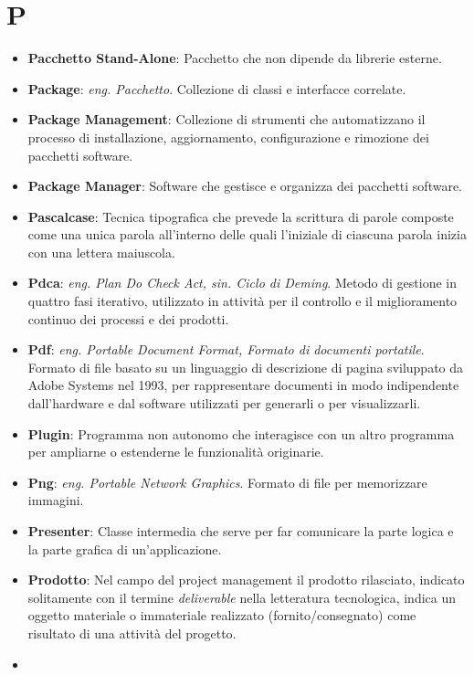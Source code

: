\section*{P}
\begin{itemize}
	\item
	\textbf{Pacchetto Stand-Alone}: Pacchetto che non dipende da librerie esterne.
	\item
	\textbf{Package}: \textit{eng. Pacchetto}. Collezione di classi e interfacce correlate.
	\item
	\textbf{Package Management}: Collezione di strumenti che automatizzano il processo di installazione, aggiornamento, configurazione e rimozione dei pacchetti software.
	\item
	\textbf{Package Manager}: Software che gestisce e organizza dei pacchetti software.
	\item
	\textbf{Pascalcase}: Tecnica tipografica che prevede la scrittura di parole composte come una unica parola all'interno delle quali l'iniziale di ciascuna parola inizia con una lettera maiuscola.
	\item
	\textbf{Pdca}: \textit{eng. Plan Do Check Act, sin. Ciclo di Deming}. Metodo di gestione in quattro fasi iterativo, utilizzato in attività per il controllo e il miglioramento continuo dei processi e dei prodotti.
	\item
	\textbf{Pdf}: \textit{eng. Portable Document Format, Formato di documenti portatile}. Formato di file basato su un linguaggio di descrizione di pagina sviluppato da Adobe Systems nel 1993, per rappresentare documenti in modo indipendente dall'hardware e dal software utilizzati per generarli o per visualizzarli.
	\item
	\textbf{Plugin}: Programma non autonomo che interagisce con un altro programma per ampliarne o estenderne le funzionalità originarie.
	\item
	\textbf{Png}: \textit{eng. Portable Network Graphics}. Formato di file per memorizzare immagini.
	\item
	\textbf{Presenter}: Classe intermedia che serve per far comunicare la parte logica e la parte grafica di un'applicazione.
	\item
	\textbf{Prodotto}: Nel campo del project management il prodotto rilasciato, indicato solitamente con il termine \textit{deliverable} nella letteratura tecnologica, indica un oggetto materiale o immateriale realizzato (fornito/consegnato) come risultato di una attività del progetto.
	\item

\end{itemize}
